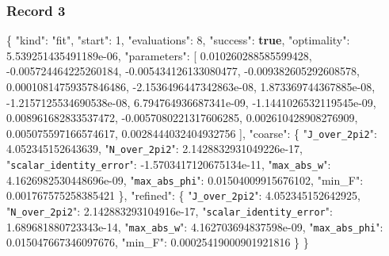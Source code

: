 \documentclass[
  10pt,
]{article}
\newenvironment{Shaded}{}{}
\newcommand{\DataTypeTok}[1]{\textcolor[rgb]{0.56,0.13,0.00}{#1}}
\newcommand{\DecValTok}[1]{\textcolor[rgb]{0.25,0.63,0.44}{#1}}
\newcommand{\FloatTok}[1]{\textcolor[rgb]{0.25,0.63,0.44}{#1}}
\newcommand{\FunctionTok}[1]{\textcolor[rgb]{0.02,0.16,0.49}{#1}}
\newcommand{\KeywordTok}[1]{\textcolor[rgb]{0.00,0.44,0.13}{\textbf{#1}}}
\newcommand{\OtherTok}[1]{\textcolor[rgb]{0.00,0.44,0.13}{#1}}
\newcommand{\StringTok}[1]{\textcolor[rgb]{0.25,0.44,0.63}{#1}}
\begin{document}
\hypertarget{record-3}{%
\subsubsection{Record 3}\label{record-3}}

\begin{Shaded}
\begin{Highlighting}[]
\FunctionTok{\{}
  \DataTypeTok{"kind"}\FunctionTok{:} \StringTok{"fit"}\FunctionTok{,}
  \DataTypeTok{"start"}\FunctionTok{:} \DecValTok{1}\FunctionTok{,}
  \DataTypeTok{"evaluations"}\FunctionTok{:} \DecValTok{8}\FunctionTok{,}
  \DataTypeTok{"success"}\FunctionTok{:} \KeywordTok{true}\FunctionTok{,}
  \DataTypeTok{"optimality"}\FunctionTok{:} \FloatTok{5.539251435491189e{-}06}\FunctionTok{,}
  \DataTypeTok{"parameters"}\FunctionTok{:} \OtherTok{[}
    \FloatTok{0.010260288585599428}\OtherTok{,}
    \FloatTok{{-}0.005724464225260184}\OtherTok{,}
    \FloatTok{{-}0.005434126133080477}\OtherTok{,}
    \FloatTok{{-}0.009382605292608578}\OtherTok{,}
    \FloatTok{0.00010814759357846486}\OtherTok{,}
    \FloatTok{{-}2.1536496447342863e{-}08}\OtherTok{,}
    \FloatTok{1.873369744367885e{-}08}\OtherTok{,}
    \FloatTok{{-}1.2157125534690538e{-}08}\OtherTok{,}
    \FloatTok{6.794764936687341e{-}09}\OtherTok{,}
    \FloatTok{{-}1.1441026532119545e{-}09}\OtherTok{,}
    \FloatTok{0.008961682833537472}\OtherTok{,}
    \FloatTok{{-}0.0057080221317606285}\OtherTok{,}
    \FloatTok{0.002610428908276909}\OtherTok{,}
    \FloatTok{0.005075597166574617}\OtherTok{,}
    \FloatTok{0.0028444032404932756}
  \OtherTok{]}\FunctionTok{,}
  \DataTypeTok{"coarse"}\FunctionTok{:} \FunctionTok{\{}
    \DataTypeTok{"\nolinkurl{J_over_2pi2}"}\FunctionTok{:} \FloatTok{4.052345152643639}\FunctionTok{,}
    \DataTypeTok{"\nolinkurl{N_over_2pi2}"}\FunctionTok{:} \FloatTok{2.1428832931049226e{-}17}\FunctionTok{,}
    \DataTypeTok{"\nolinkurl{scalar_identity_error}"}\FunctionTok{:} \FloatTok{{-}1.5703417120675134e{-}11}\FunctionTok{,}
    \DataTypeTok{"\nolinkurl{max_abs_w}"}\FunctionTok{:} \FloatTok{4.1626982530448696e{-}09}\FunctionTok{,}
    \DataTypeTok{"\nolinkurl{max_abs_phi}"}\FunctionTok{:} \FloatTok{0.01504009915676102}\FunctionTok{,}
    \DataTypeTok{"min\_F"}\FunctionTok{:} \FloatTok{0.001767575258385421}
  \FunctionTok{\},}
  \DataTypeTok{"refined"}\FunctionTok{:} \FunctionTok{\{}
    \DataTypeTok{"\nolinkurl{J_over_2pi2}"}\FunctionTok{:} \FloatTok{4.052345152642925}\FunctionTok{,}
    \DataTypeTok{"\nolinkurl{N_over_2pi2}"}\FunctionTok{:} \FloatTok{2.142883293104916e{-}17}\FunctionTok{,}
    \DataTypeTok{"\nolinkurl{scalar_identity_error}"}\FunctionTok{:} \FloatTok{1.689681880723343e{-}14}\FunctionTok{,}
    \DataTypeTok{"\nolinkurl{max_abs_w}"}\FunctionTok{:} \FloatTok{4.162703694837598e{-}09}\FunctionTok{,}
    \DataTypeTok{"\nolinkurl{max_abs_phi}"}\FunctionTok{:} \FloatTok{0.015047667346097676}\FunctionTok{,}
    \DataTypeTok{"min\_F"}\FunctionTok{:} \FloatTok{0.00025419000901921816}
  \FunctionTok{\}}
\FunctionTok{\}}
\end{Highlighting}
\end{Shaded}
\end{document}
